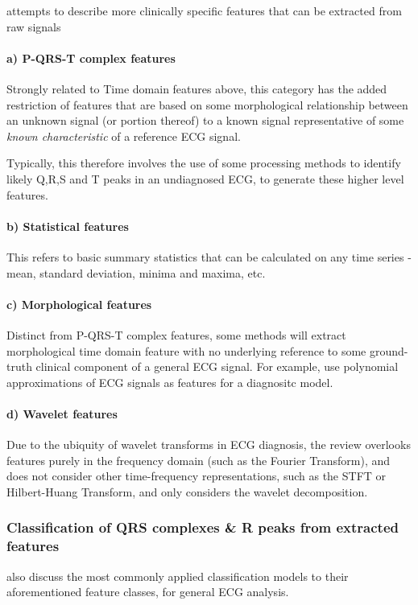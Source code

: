 \documentclass[9pt,conference]{IEEEtran}
\begin{document}
\cite{KAPLANBERKAYA2018216} attempts to describe more clinically specific features that can be extracted from raw signals

\paragraph*{a) \textbf{P-QRS-T complex features}}
Strongly related to Time domain features above, this category has the added restriction of features that are based on some morphological relationship between an unknown signal (or portion thereof) to a known signal representative of some \textit{known characteristic} of a reference ECG signal.

Typically, this therefore involves the use of some processing methods to identify likely Q,R,S and T peaks in an undiagnosed ECG, to generate these higher level features.
\paragraph*{b) \textbf{Statistical features}}
This refers to basic summary statistics that can be calculated on any time series - mean, standard deviation, minima and maxima, etc.

\paragraph*{c) \textbf{Morphological features}}
Distinct from P-QRS-T complex features, some methods will extract  morphological time domain feature with no underlying reference to some ground-truth clinical component of a general ECG signal. For example, \cite{polyApprox} use polynomial approximations of ECG signals as features for a diagnositc model.

\paragraph*{d) \textbf{Wavelet features}}
Due to the ubiquity of wavelet transforms in ECG diagnosis, the review overlooks features purely in the frequency domain (such as the Fourier Transform), and does not consider other time-frequency representations, such as the STFT or Hilbert-Huang Transform, and only considers the wavelet decomposition.

\subsubsection{Classification of QRS complexes \& R peaks from extracted features}
\cite{KAPLANBERKAYA2018216} also discuss the most commonly applied classification models to their aforementioned feature classes, for general ECG analysis.
\end{document}
